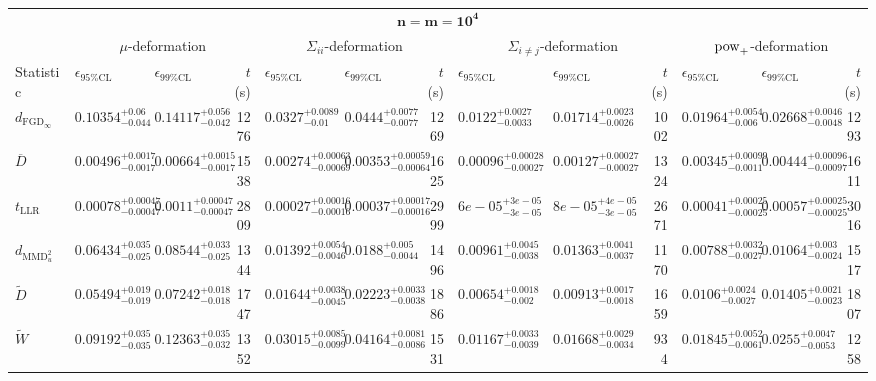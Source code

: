 \begin{tabular}{l|llr|llr|llr|llr}
		\toprule
		\multicolumn{13}{c}{$\mathbf{n=m=10^{4}}$} \\
		\multicolumn{1}{c}{}      & \multicolumn{3}{c}{$\mu$-deformation}      & \multicolumn{3}{c}{$\Sigma_{ii}$-deformation}      & \multicolumn{3}{c}{$\Sigma_{i\neq j}$-deformation}      & \multicolumn{3}{c}{$\rm{pow}_{+}$-deformation} \\
		Statistic & $\epsilon_{95\%\mathrm{CL}}$ & $\epsilon_{99\%\mathrm{CL}}$ & $t$ (s) & $\epsilon_{95\%\mathrm{CL}}$ & $\epsilon_{99\%\mathrm{CL}}$ & $t$ (s) & $\epsilon_{95\%\mathrm{CL}}$ & $\epsilon_{99\%\mathrm{CL}}$ & $t$ (s) & $\epsilon_{95\%\mathrm{CL}}$ & $\epsilon_{99\%\mathrm{CL}}$ & $t$ (s) \\
		\midrule
		$d_{\mathrm{FGD}_{\infty}}$ & $0.10354_{-0.044}^{+0.06}$ & $0.14117_{-0.042}^{+0.056}$ & 1276 & $0.0327_{-0.01}^{+0.0089}$ & $0.0444_{-0.0077}^{+0.0077}$ & 1269 & $0.0122_{-0.0033}^{+0.0027}$ & $0.01714_{-0.0026}^{+0.0023}$ & 1002 & $0.01964_{-0.006}^{+0.0054}$ & $0.02668_{-0.0048}^{+0.0046}$ & 1293 \\
		$\overline{D}$ & $0.00496_{-0.0017}^{+0.0017}$ & $0.00664_{-0.0017}^{+0.0015}$ & 1538 & $0.00274_{-0.00069}^{+0.00063}$ & $0.00353_{-0.00064}^{+0.00059}$ & 1625 & $0.00096_{-0.00027}^{+0.00028}$ & $0.00127_{-0.00027}^{+0.00027}$ & 1324 & $0.00345_{-0.0011}^{+0.00099}$ & $0.00444_{-0.00097}^{+0.00096}$ & 1611 \\
		$t_{\mathrm{LLR}}$ & $0.00078_{-0.00047}^{+0.00047}$ & $0.0011_{-0.00047}^{+0.00047}$ & 2809 & $0.00027_{-0.00016}^{+0.00016}$ & $0.00037_{-0.00016}^{+0.00017}$ & 2999 & $6e-05_{-3e-05}^{+3e-05}$ & $8e-05_{-3e-05}^{+4e-05}$ & 2671 & $0.00041_{-0.00025}^{+0.00025}$ & $0.00057_{-0.00025}^{+0.00025}$ & 3016 \\
		$d_{\mathrm{MMD}^{2}_{u}}$ & $0.06434_{-0.025}^{+0.035}$ & $0.08544_{-0.025}^{+0.033}$ & 1344 & $0.01392_{-0.0046}^{+0.0054}$ & $0.0188_{-0.0044}^{+0.005}$ & 1496 & $0.00961_{-0.0038}^{+0.0045}$ & $0.01363_{-0.0037}^{+0.0041}$ & 1170 & $0.00788_{-0.0027}^{+0.0032}$ & $0.01064_{-0.0024}^{+0.003}$ & 1517 \\
		$\widetilde{D}$ & $0.05494_{-0.019}^{+0.019}$ & $0.07242_{-0.018}^{+0.018}$ & 1747 & $0.01644_{-0.0045}^{+0.0038}$ & $0.02223_{-0.0038}^{+0.0033}$ & 1886 & $0.00654_{-0.002}^{+0.0018}$ & $0.00913_{-0.0018}^{+0.0017}$ & 1659 & $0.0106_{-0.0027}^{+0.0024}$ & $0.01405_{-0.0023}^{+0.0021}$ & 1807 \\
		$\widetilde{W}$ & $0.09192_{-0.035}^{+0.035}$ & $0.12363_{-0.032}^{+0.035}$ & 1352 & $0.03015_{-0.0099}^{+0.0085}$ & $0.04164_{-0.0086}^{+0.0081}$ & 1531 & $0.01167_{-0.0039}^{+0.0033}$ & $0.01668_{-0.0034}^{+0.0029}$ & 934 & $0.01845_{-0.0061}^{+0.0052}$ & $0.0255_{-0.0053}^{+0.0047}$ & 1258 \\

\end{tabular}

